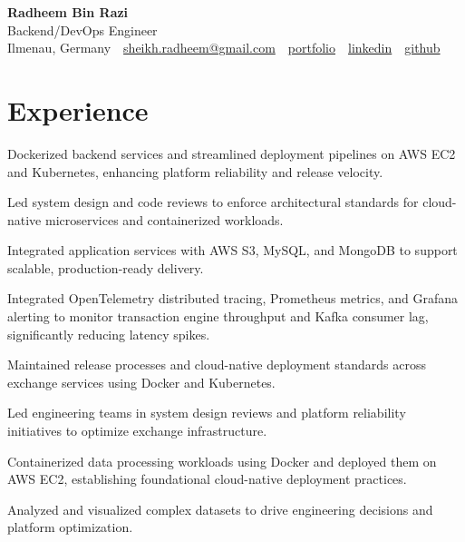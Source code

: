 \documentclass[10pt,a4paper]{resume}
\makeatletter
\newcommand{\Portfolio}{https://radheem.github.io/my-cv}
\newcommand{\PortfolioText}{portfolio}
\newcommand{\GitHub}{https://github.com/radheem}
\newcommand{\LinkedIn}{https://www.linkedin.com/in/radheem-razi}
\newcommand{\Email}{sheikh.radheem@gmail.com}
\makeatother
\begin{document}
\begin{center}
  {\huge\bfseries Radheem Bin Razi}\\[3pt]
  {\large Backend/DevOps Engineer}\\[6pt]
  \small
  Ilmenau, Germany \,\textbar\,
  \href{mailto:\Email}{\Email} \,\textbar\,
  \href{\Portfolio}{\PortfolioText} \,\textbar\,
  \href{\LinkedIn}{linkedin} \,\textbar\,
  \href{\GitHub}{github}
\end{center}
\vspace{2pt}

\section{Experience}

\bullets
  \item Dockerized backend services and streamlined deployment pipelines on AWS EC2 and Kubernetes, enhancing platform reliability and release velocity.
  \item Led system design and code reviews to enforce architectural standards for cloud-native microservices and containerized workloads.
  \item Integrated application services with AWS S3, MySQL, and MongoDB to support scalable, production-ready delivery.
\bulletsend
\vspace{1.5pt}
\bullets
  \item Integrated OpenTelemetry distributed tracing, Prometheus metrics, and Grafana alerting to monitor transaction engine throughput and Kafka consumer lag, significantly reducing latency spikes.
  \item Maintained release processes and cloud-native deployment standards across exchange services using Docker and Kubernetes.
  \item Led engineering teams in system design reviews and platform reliability initiatives to optimize exchange infrastructure.
\bulletsend
\vspace{1.5pt}
\bullets
  \item Containerized data processing workloads using Docker and deployed them on AWS EC2, establishing foundational cloud-native deployment practices.
  \item Analyzed and visualized complex datasets to drive engineering decisions and platform optimization.
\bulletsend
\vspace{1.5pt}
\end{document}
